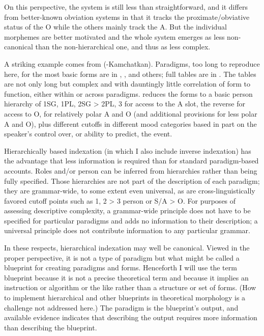 \documentclass[output=collectionpaper]{langsci/langscibook}
\begin{document}
On this perspective, the  system is still less than straightforward, and it differs from better-known obviation systems in that it tracks the proximate/obvia\-tive status of the O while the others mainly track the A. But the individual morphemes are better motivated and the whole system emerges as less non-canonical than the non-hierarchical one, and thus as less complex.

A striking example comes from  (-Kamchatkan). Paradigms, too long to reproduce here, for the most basic forms are in \citet{Nagayam2003}, \citet{Malcev1998}, and others; full tables are in \citet[639--648]{Kibrik2004}. The tables are not only long but complex and with dauntingly little correlation of form to function, either within or across paradigms. \citet{Kibrik2003} reduces the forms to a basic person hierarchy of 1SG, 1PL, 2SG > 2PL, 3 for access to the A slot, the reverse for access to O, for relatively polar A and O (and additional provisions for less polar A and O), plus different cutoffs in different mood categories based in part on the speaker's control over, or ability to predict, the event.

Hierarchically based indexation (in which I also include inverse indexation) has the advantage that less information is required than for standard paradigm-based accounts. Roles and/or person can be inferred from hierarchies rather than being fully specified. Those hierarchies are not part of the description of each paradigm; they are grammar-wide, to some extent even universal, as are cross-linguistically favored cutoff points such as 1, 2 > 3 person or S/A > O. For purposes of assessing descriptive complexity, a grammar-wide principle does not have to be specified for particular paradigms and adds no information to their description; a universal principle does not contribute information to any particular grammar.

In these respects, hierarchical indexation may well be canonical. Viewed in the proper perspective, it is not a type of paradigm but what might be called a blueprint for creating paradigms and forms. Henceforth I will use the term blueprint because it is not a precise theoretical term and because it implies an instruction or algorithm or the like rather than a structure or set of forms. (How to implement hierarchical and other blueprints in theoretical morphology is a challenge not addressed here.) The paradigm is the blueprint's output, and available evidence indicates that describing the output requires more information than describing the blueprint.
\end{document}
